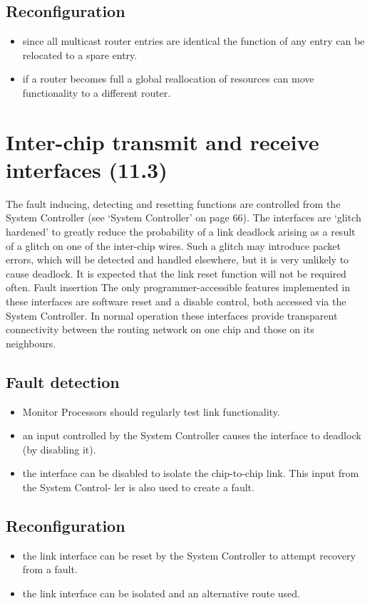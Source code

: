 \documentclass[oneside, a4paper, 11pt]{memoir}
\newenvironment{itmz}{
	\begin{itemize}
		\setlength{\itemsep}{0pt}
		\setlength{\parskip}{0pt}
	}{\end{itemize}}
\begin{document}
\subsection*{Reconfiguration}
\begin{itmz}
\item since all multicast router entries are identical the function of any entry can be relocated to a spare
entry.
\item if a router becomes full a global reallocation of resources can move functionality to a different
router.
\end{itmz}

\section{Inter-chip transmit and receive interfaces (11.3)}
The fault inducing, detecting and resetting functions are controlled from the System Controller (see
`System Controller' on page 66). The interfaces are `glitch hardened' to greatly reduce the
probability of a link deadlock arising as a result of a glitch on one of the inter-chip wires. Such a
glitch may introduce packet errors, which will be detected and handled elsewhere, but it is very
unlikely to cause deadlock. It is expected that the link reset function will not be required often.
Fault insertion
The only programmer-accessible features implemented in these interfaces are software reset and a
disable control, both accessed via the System Controller. In normal operation these interfaces
provide transparent connectivity between the routing network on one chip and those on its
neighbours.
\subsection*{Fault detection}
\begin{itmz}
\item Monitor Processors should regularly test link functionality.
\item an input controlled by the System Controller causes the interface to deadlock (by disabling it).
\item the interface can be disabled to isolate the chip-to-chip link. This input from the System Control-
ler is also used to create a fault.
\end{itmz}
\subsection*{Reconfiguration}
\begin{itmz}
\item the link interface can be reset by the System Controller to attempt recovery from a fault.
\item the link interface can be isolated and an alternative route used.
\end{itmz}
\end{document}
